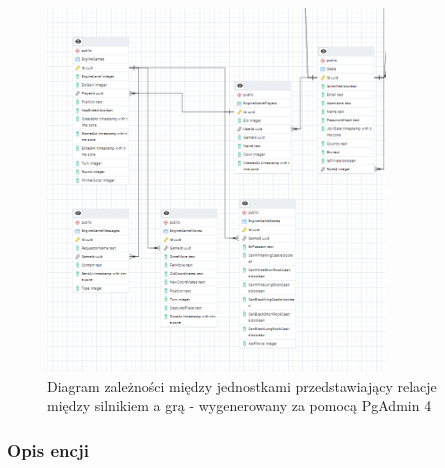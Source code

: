 \documentclass[12pt,a4paper]{article}
\begin{document}
\vspace{1cm}
\begin{figure}[h!]
    \centering
    \includegraphics[width=0.8\textwidth]{zdj/offline_ERD.png}
    \caption{Diagram zależności między jednostkami przedstawiający relacje między silnikiem a grą - wygenerowany za pomocą PgAdmin 4}
\end{figure}
\newpage


\subsubsection{Opis encji}
\end{document}
